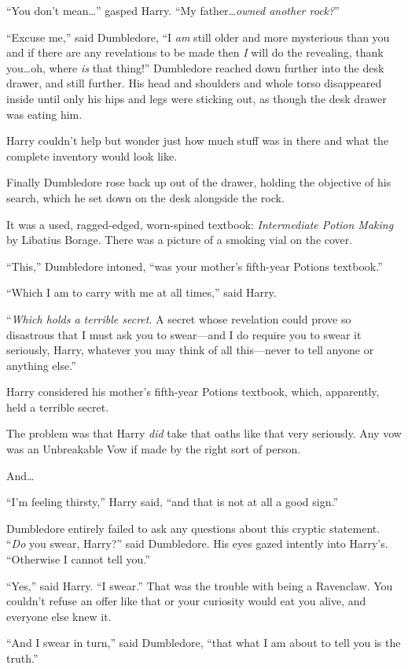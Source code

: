 “You don’t mean…” gasped Harry. “My father…\emph{owned another rock?}”

“Excuse me,” said Dumbledore, “I \emph{am} still older and more mysterious than you and if there are any revelations to be made then \emph{I} will do the revealing, thank you…oh, where \emph{is} that thing!” Dumbledore reached down further into the desk drawer, and still further. His head and shoulders and whole torso disappeared inside until only his hips and legs were sticking out, as though the desk drawer was eating him.

Harry couldn’t help but wonder just how much stuff was in there and what the complete inventory would look like.

Finally Dumbledore rose back up out of the drawer, holding the objective of his search, which he set down on the desk alongside the rock.

It was a used, ragged-edged, worn-spined textbook: \emph{Intermediate Potion Making} by Libatius Borage. There was a picture of a smoking vial on the cover.

“This,” Dumbledore intoned, “was your mother’s fifth-year Potions textbook.”

“Which I am to carry with me at all times,” said Harry.

“\emph{Which holds a terrible secret}. A secret whose revelation could prove so disastrous that I must ask you to swear—and I do require you to swear it seriously, Harry, whatever you may think of all this—never to tell anyone or anything else.”

Harry considered his mother’s fifth-year Potions textbook, which, apparently, held a terrible secret.

The problem was that Harry \emph{did} take that oaths like that very seriously. Any vow was an Unbreakable Vow if made by the right sort of person.

And…

“I’m feeling thirsty,” Harry said, “and that is not at all a good sign.”

Dumbledore entirely failed to ask any questions about this cryptic statement. “\emph{Do} you swear, Harry?” said Dumbledore. His eyes gazed intently into Harry’s. “Otherwise I cannot tell you.”

“Yes,” said Harry. “I swear.” That was the trouble with being a Ravenclaw. You couldn’t refuse an offer like that or your curiosity would eat you alive, and everyone else knew it.

“And I swear in turn,” said Dumbledore, “that what I am about to tell you is the truth.”

